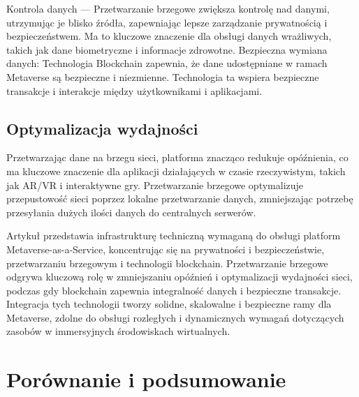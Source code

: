 Kontrola danych --- Przetwarzanie brzegowe zwiększa kontrolę nad danymi, utrzymując je blisko źródła, zapewniając lepsze zarządzanie prywatnością i bezpieczeństwem. Ma to kluczowe znaczenie dla obsługi danych wrażliwych, takich jak dane biometryczne i informacje zdrowotne.
Bezpieczna wymiana danych: Technologia Blockchain zapewnia, że dane udostępniane w ramach Metaverse są bezpieczne i niezmienne. Technologia ta wspiera bezpieczne transakcje i interakcje między użytkownikami i aplikacjami.

\subsection{Optymalizacja wydajności}

Przetwarzając dane na brzegu sieci, platforma znacząco redukuje opóźnienia, co ma kluczowe znaczenie dla aplikacji działających w czasie rzeczywistym, takich jak AR/VR i interaktywne gry.
Przetwarzanie brzegowe optymalizuje przepustowość sieci poprzez lokalne przetwarzanie danych, zmniejszając potrzebę przesyłania dużych ilości danych do centralnych serwerów.

Artykuł przedstawia infrastrukturę techniczną wymaganą do obsługi platform Metaverse-as-a-Service, koncentrując się na prywatności i bezpieczeństwie, przetwarzaniu brzegowym i technologii blockchain. Przetwarzanie brzegowe odgrywa kluczową rolę w zmniejszaniu opóźnień i optymalizacji wydajności sieci, podczas gdy blockchain zapewnia integralność danych i bezpieczne transakcje. Integracja tych technologii tworzy solidne, skalowalne i bezpieczne ramy dla Metaverse, zdolne do obsługi rozległych i dynamicznych wymagań dotyczących zasobów w immersyjnych środowiskach wirtualnych.


\section{Porównanie i podsumowanie}

